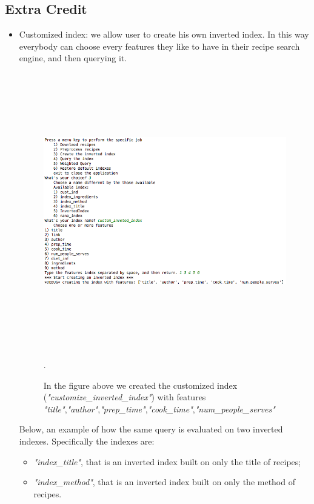 \documentclass[oneside]{article}			%
\begin{document}
	\subsection{Extra Credit}
	\begin{itemize}
		\item Customized index: we allow user to create his own inverted index. In this way everybody can choose every features they like to have in their recipe search engine, and then querying it.
		\begin{figure}[h]
			\includegraphics[width=18cm, height=12cm]{./report_file/app/create_invete_index.png}\caption{In the figure above we created the customized index (\textit{"customize\_inverted\_index"}) with features \textit{"title"},\textit{"author"},\textit{"prep\_time"},\textit{"cook\_time"},\textit{"num\_people\_serves"} }.
		\end{figure}
		\clearpage
		Below, an example of how the same query is evaluated on two inverted indexes. Specifically the indexes are:
		\begin{itemize}
			\item \textit{"index\_title"}, that is an inverted index built on only the title of recipes;
			\item \textit{"index\_method"}, that is an inverted index built on only the method of recipes.
		\end{itemize}
		\begin{figure}[h]

\end{figure}
\end{itemize}
\end{document}
